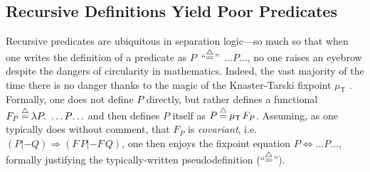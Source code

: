 \subsection{Recursive Definitions Yield Poor  Predicates}\label{sec:fixpointfail}

\newcommand{\graphkt}{\p{graph}_T}
\newcommand{\grapham}{\p{graph}_A}


Recursive predicates are ubiquitous in separation logic---so
much so that when one writes the definition of a predicate as
\mbox{$P$ ``$\mathbin{\stackrel{\triangle}{=}}$'' $\ldots P \! \ldots$}, no one raises an eyebrow despite the
dangers of circularity in mathematics. Indeed, the vast majority of the time there
is no danger thanks to the magic of the Knaster-Tarski fixpoint
$\mu_{\mathsf{T}}$ \cite{tarski:fixpoint}.  Formally, one does not define $P$ directly,
but rather defines a functional
\mbox{$F_P \mathbin{\stackrel{\triangle}{=}} \lambda P.~ \ldots P \! \ldots$} and then defines $P$ itself as
\mbox{$P \mathbin{\stackrel{\triangle}{=}} \mu_{\mathsf{T}} \, F_P$}.
Assuming, as one typically does without comment,
that $F_P$ is \emph{covariant}, i.e. $(P |- Q)
\Rightarrow (F \, P |- F \, Q)$, one then enjoys the fixpoint
equation $P \Leftrightarrow \ldots P \ldots$, formally justifying
the typically-written pseudodefinition (``$\mathbin{\stackrel{\triangle}{=}}$'').


